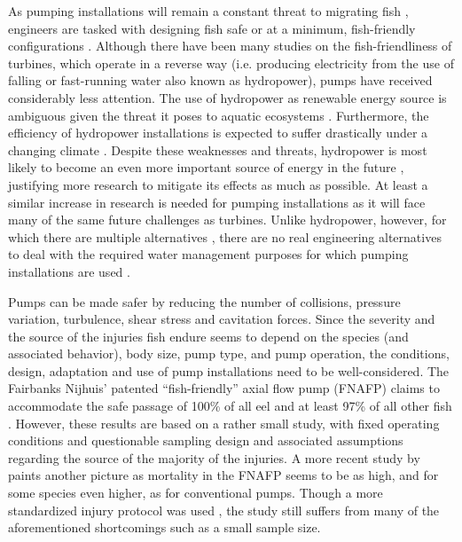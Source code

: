 \documentclass[fleqn,10pt]{wlscirep}
\begin{document}
As pumping installations will remain a constant threat to migrating fish \cite{Dudgeon2006FreshwaterChallenges}, engineers are tasked with designing fish safe or at a minimum, fish-friendly configurations \cite{Norman2023,Timmermans2022PolderUncertainty,Pan2022FishApproach}. Although there have been many studies on the fish-friendliness of turbines, which operate in a reverse way (i.e. producing electricity from the use of falling or fast-running water also known as hydropower), pumps have received considerably less attention. The use of hydropower as renewable energy source is ambiguous given the threat it poses to aquatic ecosystems \cite{Ellabban2014RenewableTechnology,Reid2019EmergingBiodiversity}. Furthermore, the efficiency of hydropower installations is expected to suffer drastically under a changing climate \cite{Li2020EvidentChange}. Despite these weaknesses and threats, hydropower is most likely to become an even more important source of energy in the future \cite{Koukouvinis2023StateIndicators,Vaidya2021TheFuture}, justifying more research to mitigate its effects as much as possible. At least a similar increase in research is needed for pumping installations as it will face many of the same future challenges as turbines. Unlike hydropower, however, for which there are multiple alternatives \cite{Ellabban2014RenewableTechnology}, there are no real engineering alternatives to deal with the required water management purposes for which pumping installations are used \cite{Gungor-Demirci2020OptimizingQuality}. 

Pumps can be made safer by reducing the number of collisions, pressure variation, turbulence, shear stress and cavitation forces. Since the severity and the source of the injuries fish endure seems to depend on the species (and associated behavior), body size, pump type, and pump operation, the conditions, design, adaptation and use of pump installations need to be well-considered. The Fairbanks Nijhuis’ patented ``fish-friendly'' axial flow pump (FNAFP) claims to accommodate the safe passage of 100\% of all eel and at least 97\% of all other fish \cite{Vriese2009OnderzoekBuisvijzel}. However, these results are based on a rather small study, with fixed operating conditions and questionable sampling design and associated assumptions regarding the source of the majority of the injuries. A more recent study by \cite{Bierschenk2019FishPumps} paints another picture as mortality in the FNAFP seems to be as high, and for some species even higher, as for conventional pumps. Though a more standardized injury protocol was used \cite{Mueller2017EvaluationProtocol}, the study still suffers from many of the aforementioned shortcomings such as a small sample size. 
\end{document}
